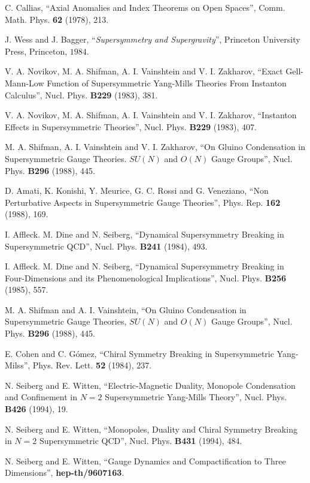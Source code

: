 \begin{thebibliography}{99}
 C. Callias, ``Axial Anomalies and Index
Theorems on Open Spaces'', Comm. Math. Phys. {\bf 62} (1978),
213.

 J. Wess and J. Bagger, ``{\em Supersymmetry and
Supergravity}'', Princeton University Press, Princeton, $1984$.

 V. A. Novikov, M. A. Shifman, A. I. Vainshtein and
V. I. Zakharov, ``Exact Gell-Mann-Low Function of Supersymmetric
Yang-Mills Theories From Instanton Calculus'', 
Nucl. Phys. {\bf B229} (1983), 381.

 V. A. Novikov, M. A. Shifman, A. I. Vainshtein and
V. I. Zakharov, ``Instanton Effects in Supersymmetric Theories'', 
Nucl. Phys. {\bf B229} (1983), 407.

 M. A. Shifman, A. I. Vainshtein and V. I.
Zakharov, ``On Gluino Condensation in Supersymmetric Gauge
Theories. $SU(N)$ and $O(N)$ Gauge Groups'', 
Nucl. Phys. {\bf B296} (1988), 445.

 D. Amati, K. Konishi, Y. Meurice, G. C. Rossi and G. Veneziano, 
``Non Perturbative Aspects in Supersymmetric Gauge Theories'', Phys. Rep. 
{\bf 162} (1988), 169.

 I. Affleck. M. Dine and N. Seiberg, ``Dynamical 
Supersymmetry Breaking in Supersymmetric QCD'', Nucl. Phys.
{\bf B241} (1984), 493.

 I. Affleck. M. Dine and N. Seiberg, ``Dynamical 
Supersymmetry Breaking in Four-Dimensions and its 
Phenomenological Implications'', Nucl. Phys.
{\bf B256} (1985), 557.

 M. A. Shifman and A. I. Vainshtein, ``On Gluino
Condensation in Supersymmetric Gauge Theories, $SU(N)$ and $O(N)$
Gauge Groups'', Nucl. Phys. {\bf B296} (1988), 445.

 E. Cohen and C. G\'{o}mez, ``Chiral Symmetry Breaking in Supersymmetric 
Yang-Milss'', Phys. Rev. Lett. {\bf 52} (1984), 237.

 N. Seiberg and E. Witten, ``Electric-Magnetic Duality, Monopole
Condensation and Confinement in $N\!=\!2$ Supersymmetric Yang-Mills Theory'',
Nucl. Phys. {\bf B426} (1994), 19. 

 N. Seiberg and E. Witten, ``Monopoles, Duality and
Chiral Symmetry Breaking in $N=2$ Supersymmetric QCD'', Nucl.
Phys. {\bf B431} (1994), 484. 

 N. Seiberg and E. Witten, ``Gauge Dynamics and Compactification
to Three Dimensions'', {\bf hep-th/9607163}.


\end{thebibliography}
